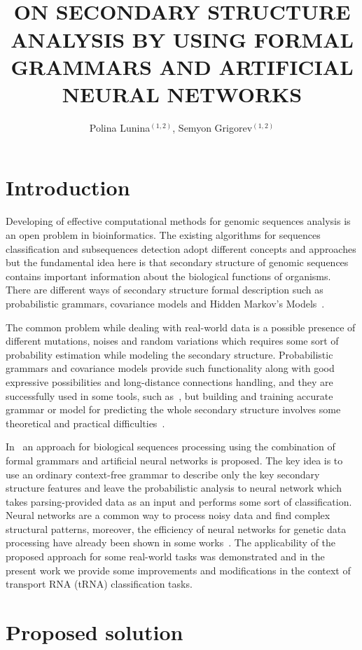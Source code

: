 \documentclass[12pt,a4paper]{cibb}
\title{\large $\ $\\ \bf ON SECONDARY STRUCTURE ANALYSIS BY USING FORMAL GRAMMARS AND ARTIFICIAL NEURAL NETWORKS}
\author{ Polina Lunina$^{(1,2)}$, Semyon Grigorev$^{(1,2)}$}
\begin{document}
\thispagestyle{myheadings}
\pagestyle{myheadings}



\section{\bf Introduction}

Developing of effective computational methods for genomic sequences analysis is an open problem in bioinformatics.
The existing algorithms for sequences classification and subsequences detection adopt different concepts and approaches but the fundamental idea here is that secondary structure of genomic sequences contains important information about the biological functions of organisms.
There are different ways of secondary structure formal description such as probabilistic grammars, covariance models and Hidden Markov’s Models~\cite{EddyDurbin,dowell2004evaluation,knudsen1999rna}. 

The common problem while dealing with real-world data is a possible presence of different mutations, noises and random variations which requires some sort of probability estimation while modeling the secondary structure.
Probabilistic grammars and covariance models provide such functionality along with good expressive possibilities and long-distance connections handling, and they are successfully used in some tools, such as~\cite{Infernal}, but building and training accurate grammar or model for predicting the whole secondary structure involves some theoretical and practical difficulties~\cite{!!!}.

In~\cite{grigorevcomposition} an approach for biological sequences processing using the combination of formal grammars and artificial neural networks is proposed.
The key idea is to use an ordinary context-free grammar to describe only the key secondary structure features and leave the probabilistic analysis to neural network which takes parsing-provided data as an input and performs some sort of classification.
Neural networks are a common way to process noisy data and find complex structural patterns, moreover, the efficiency of neural networks for genetic data processing have already been shown in some works~\cite{Humidor,ANN}.
The applicability of the proposed approach for some real-world tasks was demonstrated and in the present work we provide some improvements and modifications in the context of transport RNA (tRNA) classification tasks. 

\section{\bf Proposed solution}
\end{document}
